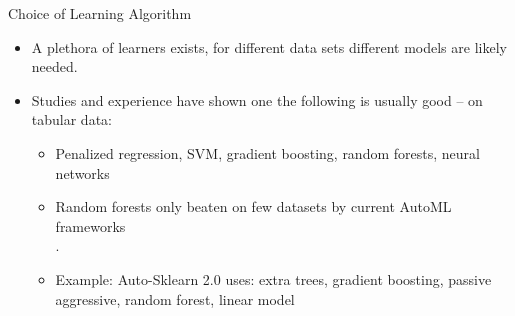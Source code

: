 \begin{frame}{Choice of Learning Algorithm}
  \begin{itemize}
    \item A plethora of learners exists, for different data sets different models
        are likely needed.
    \item Studies and experience have shown one the following 
        is usually good -- on tabular data:
    \begin{itemize}
      \item Penalized regression, SVM, gradient boosting, random forests, neural networks
      \item Random forests only beaten on few datasets by current AutoML frameworks\\.
      \item Example: Auto-Sklearn 2.0  uses: extra trees, gradient boosting, passive aggressive, random forest, linear model
    \end{itemize}
  \end{itemize}
\end{frame}

